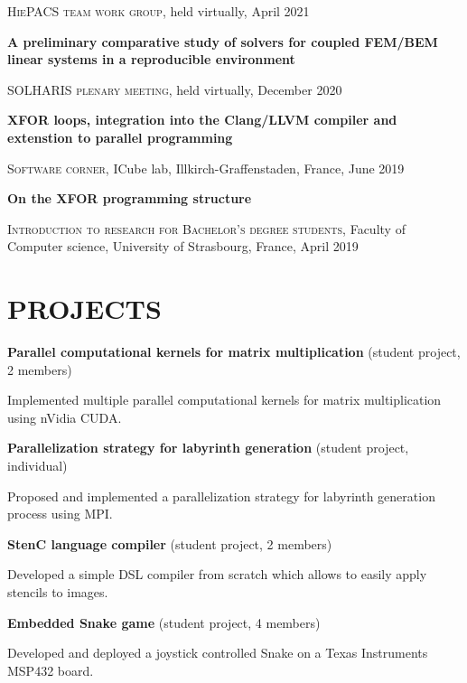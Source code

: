 \documentclass[a4paper, 11pt]{article}
\begin{document}
\textsc{HiePACS team work group}, held virtually, April 2021

\vspace{.7em}

\textbf{A preliminary comparative study of solvers for coupled FEM/BEM linear
systems in a reproducible environment}

\textsc{SOLHARIS plenary meeting}, held virtually, December 2020

\vspace{.7em}

\textbf{XFOR loops, integration into the Clang/LLVM compiler and extenstion to
parallel programming}

\textsc{Software corner}, ICube lab, Illkirch-Graffenstaden, France, June 2019

\vspace{.7em}

\textbf{On the XFOR programming structure}

\textsc{Introduction to research for Bachelor's degree students}, Faculty of
Computer science, University of Strasbourg, France, April 2019

\section*{PROJECTS}

\textbf{Parallel computational kernels for matrix multiplication} (student
project, 2 members)

Implemented multiple parallel computational kernels for matrix multiplication
using nVidia CUDA.

\vspace{.7em}

\textbf{Parallelization strategy for labyrinth generation} (student project,
individual)

Proposed and implemented a parallelization strategy for labyrinth generation
process using MPI.

\vspace{.7em}

\textbf{StenC language compiler} (student project, 2 members)

Developed a simple DSL compiler from scratch which allows to easily apply
stencils to images.

\vspace{.7em}

\textbf{Embedded Snake game} (student project, 4 members)

Developed and deployed a joystick controlled Snake on a Texas Instruments MSP432
board.
\end{document}
